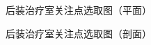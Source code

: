 \begin{figure}[H]
\centering
{}
\caption{后装治疗室关注点选取图（平面）}
\label{fig:ch4-points-plan}
\end{figure}

\begin{figure}[H]
\centering
{}
\caption{后装治疗室关注点选取图（剖面）}
\label{fig:ch4-points-section}
\end{figure}

